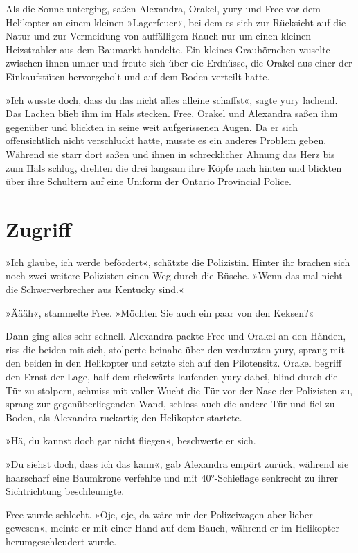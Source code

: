 Als die Sonne unterging, saßen Alexandra, Orakel, yury und Free vor dem Helikopter an einem kleinen »Lagerfeuer«, bei dem es sich zur Rücksicht auf die Natur und zur Vermeidung von auffälligem Rauch nur um einen kleinen Heizstrahler aus dem Baumarkt handelte. Ein kleines Grauhörnchen wuselte zwischen ihnen umher und freute sich über die Erdnüsse, die Orakel aus einer der Einkaufstüten hervorgeholt und auf dem Boden verteilt hatte.

»Ich wusste doch, dass du das nicht alles alleine schaffst«, sagte yury lachend. Das Lachen blieb ihm im Hals stecken. Free, Orakel und Alexandra saßen ihm gegenüber und blickten in seine weit aufgerissenen Augen. Da er sich offensichtlich nicht verschluckt hatte, musste es ein anderes Problem geben. Während sie starr dort saßen und ihnen in schrecklicher Ahnung das Herz bis zum Hals schlug, drehten die drei langsam ihre Köpfe nach hinten und blickten über ihre Schultern auf eine Uniform der Ontario Provincial Police.


\chapter{Zugriff}

»Ich glaube, ich werde befördert«, schätzte die Polizistin. Hinter ihr brachen sich noch zwei weitere Polizisten einen Weg durch die Büsche. »Wenn das mal nicht die Schwerverbrecher aus Kentucky sind.«

»Äääh«, stammelte Free. »Möchten Sie auch ein paar von den Keksen?«

Dann ging alles sehr schnell. Alexandra packte Free und Orakel an den Händen, riss die beiden mit sich, stolperte beinahe über den verdutzten yury, sprang mit den beiden in den Helikopter und setzte sich auf den Pilotensitz. Orakel begriff den Ernst der Lage, half dem rückwärts laufenden yury dabei, blind durch die Tür zu stolpern, schmiss mit voller Wucht die Tür vor der Nase der Polizisten zu, sprang zur gegenüberliegenden Wand, schloss auch die andere Tür und fiel zu Boden, als Alexandra ruckartig den Helikopter startete.

»Hä, du kannst doch gar nicht fliegen«, beschwerte er sich.

»Du siehst doch, dass ich das kann«, gab Alexandra empört zurück, während sie haarscharf eine Baumkrone verfehlte und mit 40°-Schieflage senkrecht zu ihrer Sichtrichtung beschleunigte.

Free wurde schlecht. »Oje, oje, da wäre mir der Polizeiwagen aber lieber gewesen«, meinte er mit einer Hand auf dem Bauch, während er im Helikopter herumgeschleudert wurde.

